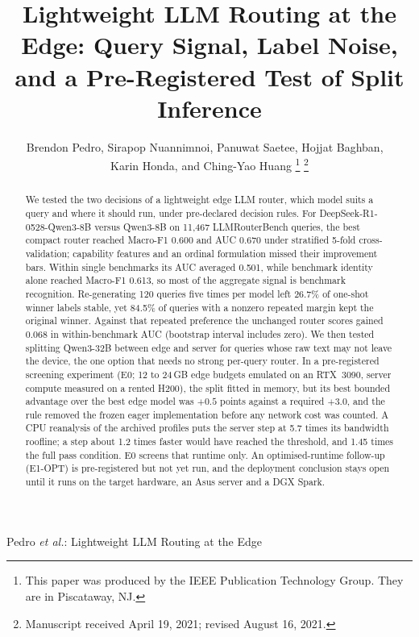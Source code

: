 \documentclass[lettersize,journal]{IEEEtran}
\newcommand{\todo}[1]{{\color{red}[TODO: #1]}}
\begin{document}
\title{Lightweight LLM Routing at the Edge: Query Signal, Label Noise, and a Pre-Registered Test of Split Inference}

\author{Brendon Pedro, Sirapop Nuannimnoi, Panuwat Saetee, Hojjat Baghban, ~ \\ Karin Honda, and Ching-Yao Huang
\thanks{This paper was produced by the IEEE Publication Technology Group. They are in Piscataway, NJ.}%
\thanks{Manuscript received April 19, 2021; revised August 16, 2021.}}

%
{Pedro \MakeLowercase{\textit{et al.}}: Lightweight LLM Routing at the Edge}


\maketitle

\begin{abstract}
We tested the two decisions of a lightweight edge LLM router, which model suits a query and where it should run, under pre-declared decision rules. For DeepSeek-R1-0528-Qwen3-8B versus Qwen3-8B on 11,467 LLMRouterBench queries, the best compact router reached Macro-F1 0.600 and AUC 0.670 under stratified 5-fold cross-validation; capability features and an ordinal formulation missed their improvement bars. Within single benchmarks its AUC averaged 0.501, while benchmark identity alone reached Macro-F1 0.613, so most of the aggregate signal is benchmark recognition. Re-generating 120 queries five times per model left 26.7\% of one-shot winner labels stable, yet 84.5\% of queries with a nonzero repeated margin kept the original winner. Against that repeated preference the unchanged router scores gained 0.068 in within-benchmark AUC (bootstrap interval includes zero). We then tested splitting Qwen3-32B between edge and server for queries whose raw text may not leave the device, the one option that needs no strong per-query router. In a pre-registered screening experiment (E0; 12 to 24\,GB edge budgets emulated on an RTX~3090, server compute measured on a rented H200), the split fitted in memory, but its best bounded advantage over the best edge model was $+0.5$ points against a required $+3.0$, and the rule removed the frozen eager implementation before any network cost was counted. A CPU reanalysis of the archived profiles puts the server step at 5.7 times its bandwidth roofline; a step about 1.2 times faster would have reached the threshold, and 1.45 times the full pass condition. E0 screens that runtime only. An optimised-runtime follow-up (E1-OPT) is pre-registered but not yet run, and the deployment conclusion stays open until it runs on the target hardware, an Asus server and a DGX Spark.
\end{abstract}
\end{document}
